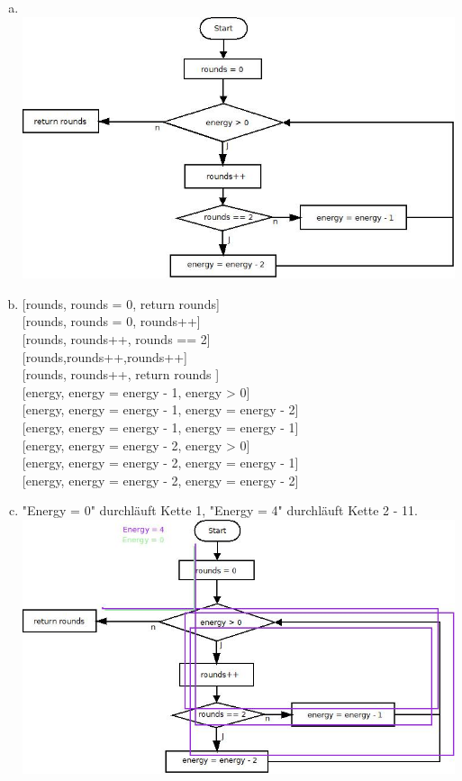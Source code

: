 \begin{enumerate} [a)]
	\item\phantom{}\\ \includegraphics[width=\textwidth, height=\textheight, keepaspectratio]{Aufgabe 20.jpeg}
	\item \phantom{} [rounds, rounds = 0, return rounds] \\
	\phantom{} [rounds, rounds = 0, rounds++] \\
		\phantom{}	[rounds, rounds++, rounds == 2] \\
		\phantom{} [rounds,rounds++,rounds++] \\
\phantom{}	[rounds, rounds++, return rounds ]\\
\phantom{}	[energy, energy = energy - 1, energy > 0] \\
\phantom{}	[energy, energy = energy - 1, energy = energy - 2] \\
\phantom{}	[energy, energy = energy - 1, energy = energy - 1] \\
\phantom{}	[energy, energy = energy - 2, energy > 0] \\
\phantom{}	[energy, energy = energy - 2, energy = energy - 1] \\
\phantom{}	[energy, energy = energy - 2, energy = energy - 2] \\
\pagebreak
\item  "\phantom{}Energy = 0"\phantom{} durchläuft Kette 1, "\phantom{}Energy = 4"\phantom{} durchläuft Kette 2 - 11.\\  \includegraphics[width=\textwidth, height=\textheight, keepaspectratio]{Aufgabe 20 DU.jpeg}
\end{enumerate}
